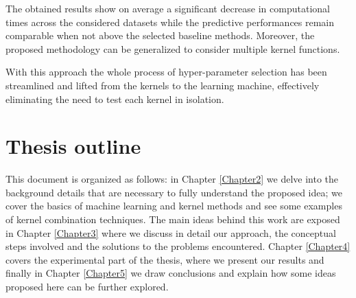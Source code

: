 
The obtained results show on average a significant decrease in computational times across the
considered datasets while the predictive performances remain comparable when not
above the selected baseline methods.
Moreover, the proposed methodology can be generalized to consider multiple kernel functions.

With this approach the whole process of hyper-parameter selection has been streamlined and
lifted from the kernels to the learning machine, effectively eliminating the need to test each
kernel in isolation.


\section{Thesis outline}
This document is organized as follows: in Chapter \ref{Chapter2} we delve into
the background details that are necessary to fully understand the proposed idea;
we cover the basics of machine learning and kernel methods and see some examples
of kernel combination techniques.
The main ideas behind this work are exposed in Chapter \ref{Chapter3} where we
discuss in detail our approach, the conceptual steps involved and the solutions
to the problems encountered.
Chapter \ref{Chapter4} covers the experimental part of the thesis, where we present
our results and finally in Chapter \ref{Chapter5} we draw conclusions and explain
how some ideas proposed here can be further explored.


